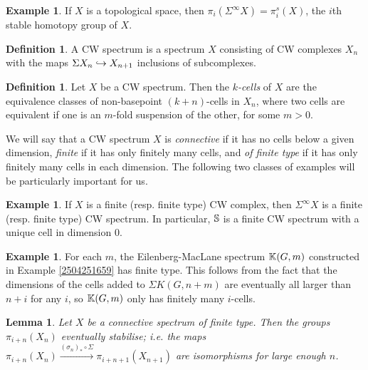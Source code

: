 \documentclass[11pt, titlepage]{article} %
\def\bb{\ensuremath\mathbb}
\def\inj{\ensuremath\hookrightarrow}
\numberwithin{equation}{subsection}
\theoremstyle{plain}
\newtheorem{lemma}[theorem]{Lemma}
\theoremstyle{definition}
\newtheorem{definition}[theorem]{Definition}
\newtheorem{example}[theorem]{Example}
\begin{document}
\begin{example}
If \(X\) is a topological space, then \(\pi_i(\Sigma^\infty X)=\pi_i^s(X)\), the \(i\)th stable homotopy group of \(X\). 
\end{example}

\begin{definition}
A CW spectrum is a spectrum \(X\) consisting of CW complexes \(X_n\) with the maps \(\Sigma X_n \inj X_{n+1}\) inclusions of subcomplexes. 
\end{definition}

\begin{definition}
Let \(X\) be a CW spectrum. Then the \textit{\(k\)-cells} of \(X\) are the equivalence classes of non-basepoint \((k+n)\)-cells in \(X_n\), where two cells are equivalent if one is an \(m\)-fold suspension of the other, for some \(m>0\). 
\end{definition}


We will say that a CW spectrum \(X\) is \textit{connective} if it has no cells below a given dimension, \textit{finite} if it has only finitely many cells, and \textit{of finite type} if it has only finitely many cells in each dimension. The following two classes of examples will be particularly important for us.

\begin{example}
If \(X\) is a finite (resp. finite type) CW complex, then \(\Sigma^\infty X\) is a finite (resp. finite type) CW spectrum. In particular, \(\bb{S}\) is a finite CW spectrum with a unique cell in dimension 0.
\end{example}

\begin{example}\label{2504251704}
For each \(m\), the Eilenberg-MacLane spectrum \(\bb{K}(G, m)\) constructed in Example \ref{2504251659} has finite type. This follows from the fact that the dimensions of the cells added to \(\Sigma K(G,n+m)\) are eventually all larger than \(n+i\) for any \(i\), so \(\bb{K}(G, m)\) only has finitely many \(i\)-cells. 
\end{example}

\begin{lemma}\label{2504151105}
Let \(X\) be a connective spectrum of finite type. Then the groups \(\pi_{i+n}(X_n)\) eventually stabilise; i.e. the maps \(\pi_{i+n}(X_n) \xrightarrow{(\sigma_n)_*\circ \Sigma} \pi_{i+n+1}(X_{n+1})\) are isomorphisms for large enough \(n\). 
\end{lemma}
\end{document}
